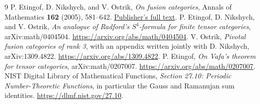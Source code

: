 \documentclass[11pt]{article}
\theoremstyle{remark}\newtheorem{remark}[theorem]{Remark}
\begin{document}
\begin{thebibliography}{9}
 P. Etingof, D. Nikshych, and V. Ostrik, \emph{On fusion categories}, Annals of Mathematics \textbf{162} (2005), 581--642. \href{https://annals.math.princeton.edu/wp-content/uploads/annals-v162-n2-p01.pdf}{Publisher's full text}.
 P. Etingof, D. Nikshych, and V. Ostrik, \emph{An analogue of Radford's $S^4$-formula for finite tensor categories}, arXiv:math/0404504. \url{https://arxiv.org/abs/math/0404504}.
 V. Ostrik, \emph{Pivotal fusion categories of rank 3}, with an appendix written jointly with D. Nikshych, arXiv:1309.4822. \url{https://arxiv.org/abs/1309.4822}.
 P. Etingof, \emph{On Vafa's theorem for tensor categories}, arXiv:math/0207007. \url{https://arxiv.org/abs/math/0207007}.
 NIST Digital Library of Mathematical Functions, \emph{Section 27.10: Periodic Number-Theoretic Functions}, in particular the Gauss and Ramanujan sum identities. \url{https://dlmf.nist.gov/27.10}.
\end{thebibliography}
\end{document}
